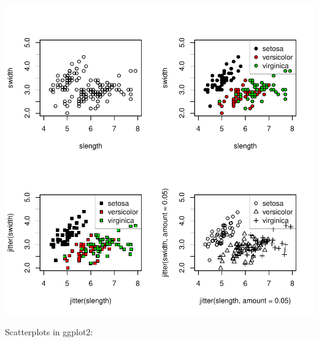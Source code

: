 \documentclass[12pt,letterpaper,final]{article}
\begin{document}
\includegraphics{lect_main-001}


\newpage


Scatterplots in ggplot2:
\end{document}
